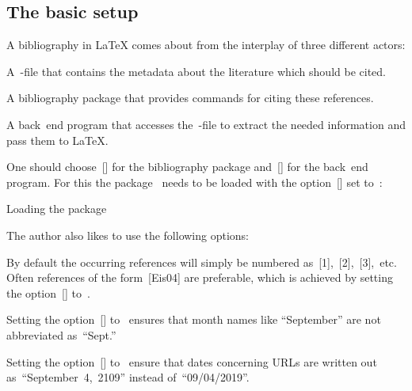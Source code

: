 \subsection{The basic setup}

A bibliography in {\LaTeX} comes about from the interplay of three different actors:
\begin{myitemize}
  \item
    A~-file that contains the metadata about the literature which should be cited.
  \item
    A bibliography package that provides commands for citing these references.
  \item
    A back~end program that accesses the~-file to extract the needed information and pass them to {\LaTeX}.
\end{myitemize}
One should choose~[\packname] for the bibliography package and~[\appname] for the back~end program.
For this the package~ needs to be loaded with the option~[\optname] set to~:
\begin{showcode}{Loading the package~}
\usepackage[backend = biber]{biblatex}
\end{showcode}
The author also likes to use the following options:
\begin{myitemize}
  \item
    By default the occurring references will simply be numbered as~[1],~[2],~[3],~etc\@.
    Often references of the form~[Eis04] are preferable, which is achieved by setting the option~[\optname] to~.
  \item
    Setting the option~[\optname] to~ ensures that month names like \enquote{September} are not abbreviated as~\enquote{Sept.}
  \item
    Setting the option~[\optname] to~ ensure that dates concerning URLs are written out as~\enquote{September~4,~2109} instead of~\enquote{09/04/2019}.
\end{myitemize}



